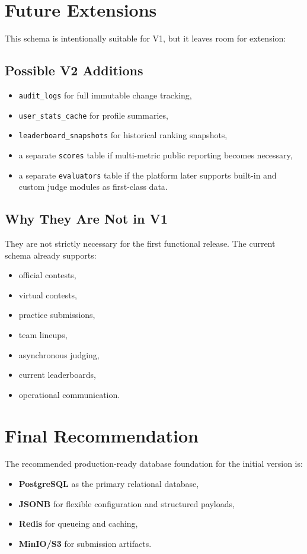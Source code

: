 \documentclass[11pt,a4paper]{article}
\begin{document}
\section{Future Extensions}
This schema is intentionally suitable for V1, but it leaves room for extension:

\subsection{Possible V2 Additions}
\begin{itemize}
    \item \texttt{audit\_logs} for full immutable change tracking,
    \item \texttt{user\_stats\_cache} for profile summaries,
    \item \texttt{leaderboard\_snapshots} for historical ranking snapshots,
    \item a separate \texttt{scores} table if multi-metric public reporting becomes necessary,
    \item a separate \texttt{evaluators} table if the platform later supports built-in and custom judge modules as first-class data.
\end{itemize}

\subsection{Why They Are Not in V1}
They are not strictly necessary for the first functional release. The current schema already supports:
\begin{itemize}
    \item official contests,
    \item virtual contests,
    \item practice submissions,
    \item team lineups,
    \item asynchronous judging,
    \item current leaderboards,
    \item operational communication.
\end{itemize}

\section{Final Recommendation}
The recommended production-ready database foundation for the initial version is:
\begin{itemize}
    \item \textbf{PostgreSQL} as the primary relational database,
    \item \textbf{JSONB} for flexible configuration and structured payloads,
    \item \textbf{Redis} for queueing and caching,
    \item \textbf{MinIO/S3} for submission artifacts.
\end{itemize}
\end{document}
